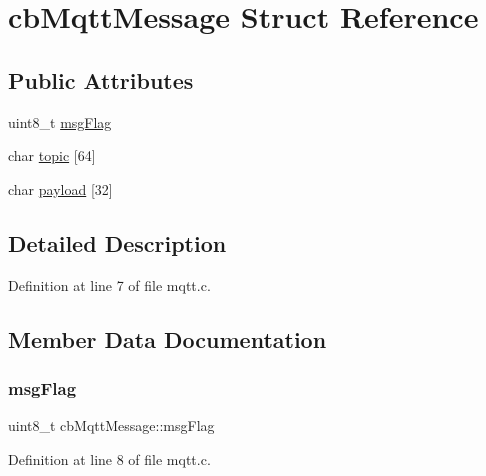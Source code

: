 \hypertarget{structcbMqttMessage}{}\section{cb\+Mqtt\+Message Struct Reference}
\label{structcbMqttMessage}
\subsection*{Public Attributes}
\begin{DoxyCompactItemize}
\item 
uint8\+\_\+t \hyperlink{structcbMqttMessage_abae79b495109206458732a3eef57a7a7}{msg\+Flag}
\item 
char \hyperlink{structcbMqttMessage_aa40e9bbbebf6f869102542591b82f0a2}{topic} \mbox{[}64\mbox{]}
\item 
char \hyperlink{structcbMqttMessage_ad56d1fb53f810a0aaba33b0244474278}{payload} \mbox{[}32\mbox{]}
\end{DoxyCompactItemize}


\subsection{Detailed Description}


Definition at line 7 of file mqtt.\+c.



\subsection{Member Data Documentation}
\mbox{\label{structcbMqttMessage_abae79b495109206458732a3eef57a7a7}} 
\subsubsection{\texorpdfstring{msg\+Flag}{msgFlag}}
{\footnotesize\ttfamily uint8\+\_\+t cb\+Mqtt\+Message\+::msg\+Flag}



Definition at line 8 of file mqtt.\+c.

\mbox{\label{structcbMqttMessage_ad56d1fb53f810a0aaba33b0244474278}} 
